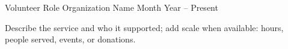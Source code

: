 

\begin{cventries}

  \cventry
    {Volunteer Role} %
    {Organization Name} %
    {} %
    {Month Year -- Present} %
    {
      \begin{cvitems}
        \item {Describe the service and who it supported; add scale when available: hours, people served, events, or donations.}
      \end{cvitems}
    }

\end{cventries}
